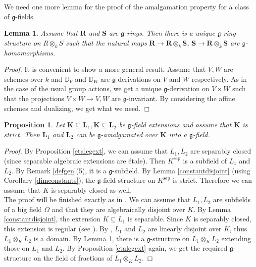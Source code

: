 \documentclass[10pt]{amsart}
\DeclareMathOperator{\sep}{sep}\DeclareMathOperator{\tw}{tw}\DeclareMathOperator{\ord}{ord}\DeclareMathOperator{\ffix}{Fix}
\newtheorem{prop}[theorem]{Proposition}
\newtheorem{lemma}[theorem]{Lemma}
\theoremstyle{definition}
\begin{document}
\noindent
We need one more lemma for the proof of the amalgamation property for a class of $\mathfrak{g}$-fields.
\begin{lemma}\label{forap}
Assume that $\mathbf{R}$ and $\mathbf{S}$ are $\mathfrak{g}$-rings. Then there is a unique $\mathfrak{g}$-ring structure on $R\otimes_kS$ such that the natural maps $\mathbf{R}\to \mathbf{R}\otimes_k\mathbf{S}$, $\mathbf{S}\to \mathbf{R}\otimes_k\mathbf{S}$ are $\mathfrak{g}$-homomorphisms.
\end{lemma}
\begin{proof}
It is convenient to show a more general result. Assume that $V,W$ are schemes over $k$ and $\mathbb{D}_V$ and $\mathbb{D}_W$ are $\mathfrak{g}$-derivations on $V$ and $W$ respectively. As in the case of the usual group actions, we get a unique $\mathfrak{g}$-derivation on $V\times W$ such that the projections $V\times W\to V,W$ are $\mathfrak{g}$-invariant. By considering the affine schemes and dualizing, we get what we need.
\end{proof}
\begin{prop}\label{lambdaap}
Let $\mathbf{K}\subseteq \mathbf{L}_1,\mathbf{K}\subseteq \mathbf{L}_2$ be $\mathfrak{g}$-field extensions and assume that $\mathbf{K}$ is strict. Then $\mathbf{L}_1$ and $\mathbf{L}_2$ can be $\mathfrak{g}$-amalgamated over $\mathbf{K}$ into a $\mathfrak{g}$-field.
\end{prop}
\begin{proof}
By Proposition \ref{etalegext}, we can assume that
$L_1,L_2$ are separably closed (since separable algebraic extensions are \'{e}tale). Then $K^{\sep}$ is a subfield of $L_1$ and $L_2$. By Remark \ref{defgen}(5), it is a $\mathfrak{g}$-subfield. By Lemma \ref{constantdisjoint} (using Corollary \ref{dimconstants}), the $\mathfrak{g}$-field structure on $K^{\sep}$ is strict. Therefore we can assume that $K$ is separably closed as well.
\\
The proof will be finished exactly as in \cite[Prop. 2.6]{Zieg2}. We can assume that $L_1,L_2$ are subfields of a big field $\Omega$ and that they are algebraically disjoint over $K$. By Lemma \ref{constantdisjoint}, the extension $K\subseteq L_1$ is separable. Since $K$ is separably closed, this extension is regular (see \cite[p. 367]{lang2002algebra}). By \cite[Thm. VIII 4.12]{lang2002algebra}, $L_1$ and $L_2$ are linearly disjoint over $K$, thus $L_1\otimes_KL_2$ is a domain. By Lemma \ref{forap}, there is a $\mathfrak{g}$-structure on $L_1\otimes_KL_2$ extending those on $L_1$ and $L_2$. By Proposition \ref{etalegext} again, we get the required $\mathfrak{g}$-structure on the field of fractions of $L_1\otimes_KL_2$.
\end{proof}
\end{document}
